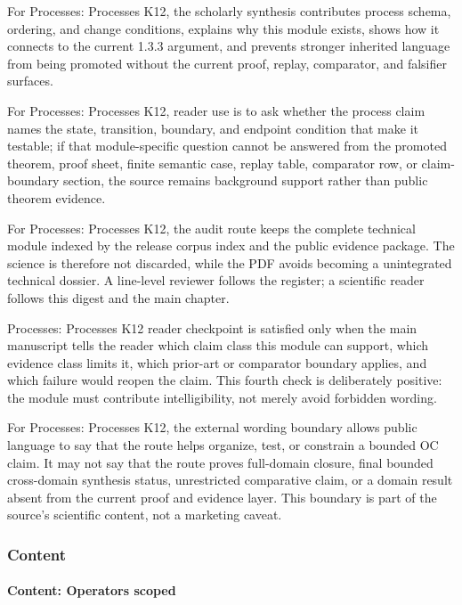 For Processes: Processes K12, the scholarly synthesis contributes process schema, ordering, and change conditions, explains why this module exists, shows how it connects to the current 1.3.3 argument, and prevents stronger inherited language from being promoted without the current proof, replay, comparator, and falsifier surfaces.


For Processes: Processes K12, reader use is to ask whether the process claim names the state, transition, boundary, and endpoint condition that make it testable; if that module-specific question cannot be answered from the promoted theorem, proof sheet, finite semantic case, replay table, comparator row, or claim-boundary section, the source remains background support rather than public theorem evidence.


For Processes: Processes K12, the audit route keeps the complete technical module indexed by the release corpus index and the public evidence package. The science is therefore not discarded, while the PDF avoids becoming a unintegrated technical dossier. A line-level reviewer follows the register; a scientific reader follows this digest and the main chapter.


Processes: Processes K12 reader checkpoint is satisfied only when the main manuscript tells the reader which claim class this module can support, which evidence class limits it, which prior-art or comparator boundary applies, and which failure would reopen the claim. This fourth check is deliberately positive: the module must contribute intelligibility, not merely avoid forbidden wording.


For Processes: Processes K12, the external wording boundary allows public language to say that the route helps organize, test, or constrain a bounded OC claim. It may not say that the route proves full-domain closure, final bounded cross-domain synthesis status, unrestricted comparative claim, or a domain result absent from the current proof and evidence layer. This boundary is part of the source's scientific content, not a marketing caveat.


\subsubsection{Content}

\paragraph{Content: Operators scoped}

